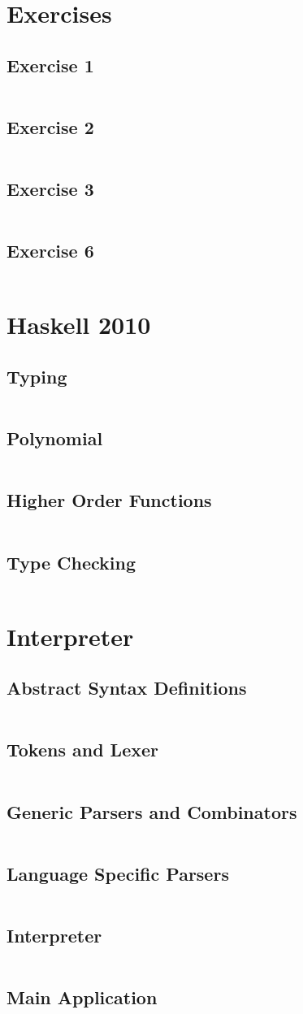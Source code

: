 \documentclass[a4paper,9pt]{article}
\newcommand{\hsfile}[1]{\inputminted[breaklines]{haskell}{../haskell/#1.hs}}
\begin{document}
\section{Exercises}
\subsection{Exercise 1}
\hsfile{ex01/ex01}
\subsection{Exercise 2}
\hsfile{ex02/ex02}
\subsection{Exercise 3}
\hsfile{ex03/ex03}
\subsection{Exercise 6}
\hsfile{ex06/ex06}
\section{Haskell 2010}
\subsection{Typing}
\hsfile{exam2010/problem_1}
\subsection{Polynomial}
\hsfile{exam2010/problem_2}
\subsection{Higher Order Functions}
\hsfile{exam2010/problem_3}
\subsection{Type Checking}
\hsfile{exam2010/problem_4}
\section{Interpreter}
\subsection{Abstract Syntax Definitions}
\hsfile{interpreter/AbsSyn}
\subsection{Tokens and Lexer}
\hsfile{interpreter/Scanner}
\subsection{Generic Parsers and Combinators}
\hsfile{interpreter/ParserCombis2}
\subsection{Language Specific Parsers}
\hsfile{interpreter/Parser2}
\subsection{Interpreter}
\hsfile{interpreter/Interpreter}
\subsection{Main Application}
\hsfile{interpreter/Main}
\end{document}

